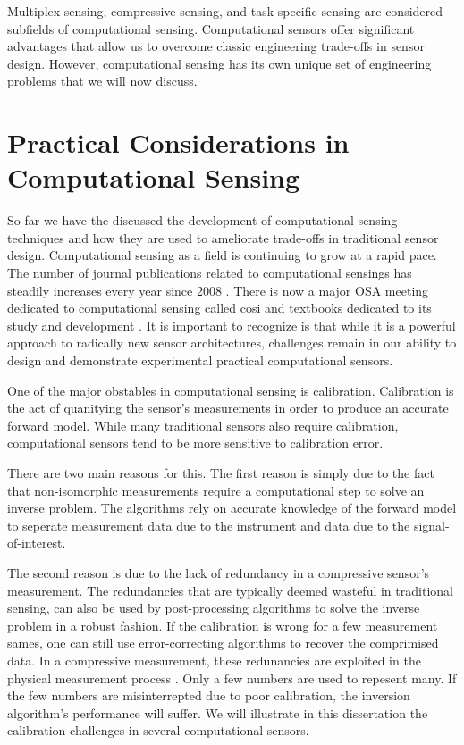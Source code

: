 Multiplex sensing, compressive sensing, and task-specific sensing are considered subfields of computational sensing. Computational sensors offer significant advantages that allow us to overcome classic engineering trade-offs in sensor design. However, computational sensing has its own unique set of engineering problems that we will now discuss.

\section{Practical Considerations in Computational Sensing}

So far we have the discussed the development of computational sensing techniques and how they are used to ameliorate trade-offs in traditional sensor design. Computational sensing as a field is continuing to grow at a rapid pace. The number of journal publications related to computational sensings has steadily increases every year since 2008 \cite{stern2016hurdles}. There is now a major OSA meeting dedicated to computational sensing called \gls{cosi} \cite{cosi2016meetingwebsite} and textbooks dedicated to its study and development \cite{brady2009optical, foucart2013mathematical}. It is important to recognize is that while it is a powerful approach to radically new sensor architectures, challenges remain in our ability to design and demonstrate experimental practical computational sensors.

One of the major obstables in computational sensing is calibration. Calibration is the act of quanitying the sensor's measurements in order to produce an accurate forward model. While many traditional sensors also require calibration, computational sensors tend to be more sensitive to calibration error. 

There are two main reasons for this. The first reason is simply due to the fact that non-isomorphic measurements require a computational step to solve an inverse problem. The algorithms rely on accurate knowledge of the forward model to seperate measurement data due to the instrument and data due to the signal-of-interest. 

The second reason is due to the lack of redundancy in a compressive sensor's measurement. The redundancies that are typically deemed wasteful in traditional sensing, can also be used by post-processing algorithms to solve the inverse problem in a robust fashion. If the calibration is wrong for a few measurement sames, one can still use error-correcting algorithms to recover the comprimised data. In a compressive measurement, these redunancies are exploited in the physical measurement process \cite{gehm2013calibration}. Only a few numbers are used to repesent many. If the few numbers are misinterrepted due to poor calibration, the inversion algorithm's performance will suffer. We will illustrate in this dissertation the calibration challenges in several computational sensors. 

